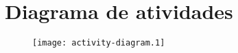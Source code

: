 \section{Diagrama de atividades}
\begin{figure}[H]
    \centering
    \texttt{[image: activity-diagram.1]}
\end{figure}
